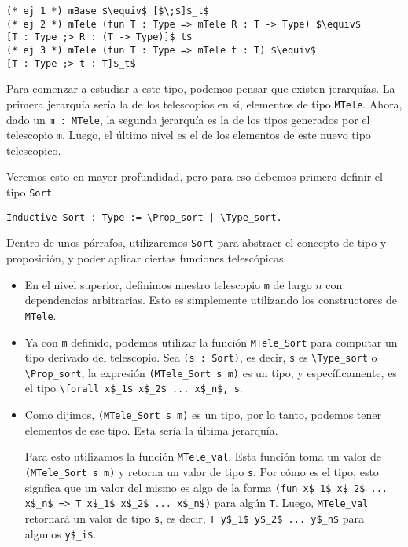 \begin{lstlisting}[frame=tb,caption={Notación de telescopios},label=lst:not_tele]
(* ej 1 *) mBase $\equiv$ [$\;$]$_t$
(* ej 2 *) mTele (fun T : Type => mTele R : T -> Type) $\equiv$
[T : Type ;> R : (T -> Type)]$_t$
(* ej 3 *) mTele (fun T : Type => mTele t : T) $\equiv$
[T : Type ;> t : T]$_t$
\end{lstlisting}

Para comenzar a estudiar a este tipo, podemos pensar que existen jerarquías.
La primera jerarquía sería la de los telescopios en sí, elementos de tipo \lstinline{MTele}.
Ahora, dado un \lstinline{m : MTele}, la segunda jerarquía es la de los tipos generados por el telescopio \lstinline{m}.
Luego, el último nivel es el de los elementos de este nuevo tipo telescopico.

Veremos esto en mayor profundidad, pero para eso debemos primero definir el tipo \lstinline{Sort}.

\begin{lstlisting}[frame=tb,caption={Definición de \lstinline{Sort}},label=lst:Sort]
Inductive Sort : Type := \Prop_sort | \Type_sort.
\end{lstlisting}

Dentro de unos párrafos, utilizaremos \lstinline{Sort} para abstraer el concepto de tipo y proposición, y poder aplicar ciertas funciones telescópicas.

\begin{itemize}
  \item En el nivel superior, definimos nuestro telescopio \lstinline{m} de largo $n$ con dependencias arbitrarias. Esto es simplemente utilizando los constructores de \lstinline{MTele}.
  \item Ya con \lstinline{m} definido, podemos utilizar la función \lstinline{MTele_Sort} para computar un tipo derivado del telescopio. Sea \lstinline{(s : Sort)}, es decir, \lstinline{s} es \lstinline{\Type_sort} o \lstinline{\Prop_sort}, la expresión \lstinline{(MTele_Sort s m)} es un tipo, y específicamente, es el tipo \lstinline{\forall x$_1$ x$_2$ ... x$_n$, s}.
  \item Como dijimos, \lstinline{(MTele_Sort s m)} es un tipo, por lo tanto, podemos tener elementos de ese tipo. Esta sería la última jerarquía.
  
  Para esto utilizamos la función \lstinline{MTele_val}. Esta función toma un valor de \lstinline{(MTele_Sort s m)} y retorna un valor de tipo \lstinline{s}. Por cómo es el tipo, esto signfica que un valor del mismo es algo de la forma \lstinline{(fun x$_1$ x$_2$ ... x$_n$ => T x$_1$ x$_2$ ... x$_n$)} para algún \lstinline{T}. Luego, \lstinline{MTele_val} retornará un valor de tipo \lstinline{s}, es decir, \lstinline{T y$_1$ y$_2$ ... y$_n$} para algunos \lstinline{y$_i$}.
\end{itemize}


